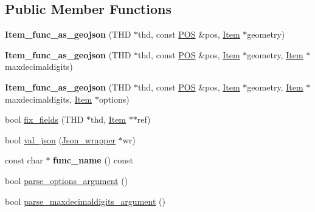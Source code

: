 \subsection*{Public Member Functions}
\begin{DoxyCompactItemize}
\item 
\mbox{\label{classItem__func__as__geojson_a9b55adf58a976ab6babe483863e807f2}} 
{\bfseries Item\+\_\+func\+\_\+as\+\_\+geojson} (T\+HD $\ast$thd, const \mbox{\hyperlink{structYYLTYPE}{P\+OS}} \&pos, \mbox{\hyperlink{classItem}{Item}} $\ast$geometry)
\item 
\mbox{\label{classItem__func__as__geojson_a0a1b701de410228f5ffbe7df119030b7}} 
{\bfseries Item\+\_\+func\+\_\+as\+\_\+geojson} (T\+HD $\ast$thd, const \mbox{\hyperlink{structYYLTYPE}{P\+OS}} \&pos, \mbox{\hyperlink{classItem}{Item}} $\ast$geometry, \mbox{\hyperlink{classItem}{Item}} $\ast$maxdecimaldigits)
\item 
\mbox{\label{classItem__func__as__geojson_a662562566ceed5f274d517208623dce1}} 
{\bfseries Item\+\_\+func\+\_\+as\+\_\+geojson} (T\+HD $\ast$thd, const \mbox{\hyperlink{structYYLTYPE}{P\+OS}} \&pos, \mbox{\hyperlink{classItem}{Item}} $\ast$geometry, \mbox{\hyperlink{classItem}{Item}} $\ast$maxdecimaldigits, \mbox{\hyperlink{classItem}{Item}} $\ast$options)
\item 
bool \mbox{\hyperlink{classItem__func__as__geojson_ae3c03fcff07e6a227a22639d792e70f4}{fix\+\_\+fields}} (T\+HD $\ast$thd, \mbox{\hyperlink{classItem}{Item}} $\ast$$\ast$ref)
\item 
bool \mbox{\hyperlink{classItem__func__as__geojson_a5d5fa5457258b65c6123d14145c45bdd}{val\+\_\+json}} (\mbox{\hyperlink{classJson__wrapper}{Json\+\_\+wrapper}} $\ast$wr)
\item 
\mbox{\label{classItem__func__as__geojson_a11ce6fe239cf1869467c4be6a122c992}} 
const char $\ast$ {\bfseries func\+\_\+name} () const
\item 
bool \mbox{\hyperlink{classItem__func__as__geojson_a9b8654280ee07ffb07a25643f31ff0db}{parse\+\_\+options\+\_\+argument}} ()
\item 
bool \mbox{\hyperlink{classItem__func__as__geojson_a3cafd9620dbcc041154c7f57c349ad3d}{parse\+\_\+maxdecimaldigits\+\_\+argument}} ()
\end{DoxyCompactItemize}
